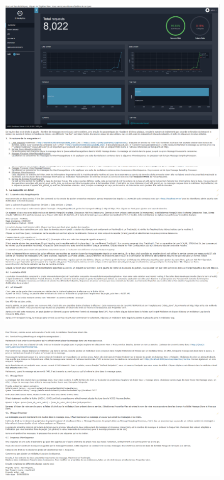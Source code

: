\documentclass[12pt,a4paper,twoside]{article}
\begin{document}
\begin{figure}[H]
	\includegraphics[width=\textwidth, height= 0.45\textheight]{wiki4.PNG}
\end{figure}
\begin{figure}[H]
	\includegraphics[width=\textwidth, height= 0.45\textheight]{wiki5.PNG}
\end{figure}
\begin{figure}[H]
	\includegraphics[width=\textwidth, height= 0.45\textheight]{wiki6.PNG}
\end{figure}
\end{document}
